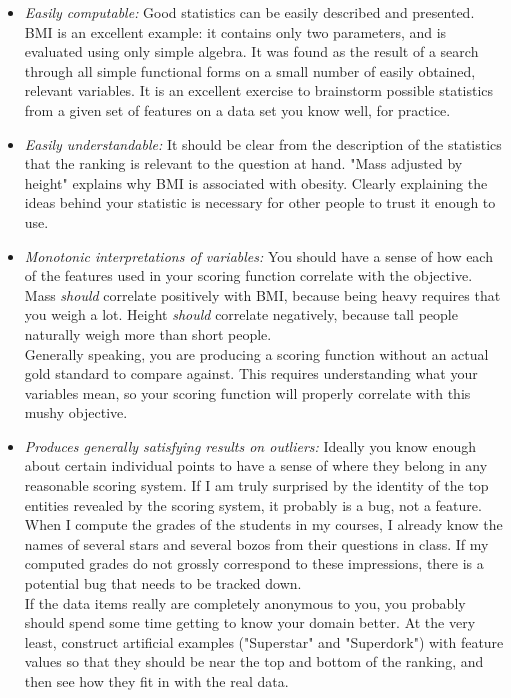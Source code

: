 \documentclass[10pt]{article}
\begin{document}
\begin{itemize}
    \item \textit{Easily computable:} Good statistics can be easily described and presented. BMI is an excellent example: it contains only two parameters, and is evaluated using only simple algebra. It was found as the result of a search through all simple functional forms on a small number of easily obtained, relevant variables. It is an excellent exercise to brainstorm possible statistics from a given set of features on a data set you know well, for practice.
    \item \textit{Easily understandable:} It should be clear from the description of the statistics that the ranking is relevant to the question at hand. "Mass adjusted by height" explains why BMI is associated with obesity. Clearly explaining the ideas behind your statistic is necessary for other people to trust it enough to use.
    \item \textit{Monotonic interpretations of variables:} You should have a sense of how each of the features used in your scoring function correlate with the objective. Mass \textit{should} correlate positively with BMI, because being heavy requires that you weigh a lot. Height \textit{should} correlate negatively, because tall people naturally weigh more than short people.\\
    Generally speaking, you are producing a scoring function without an actual gold standard to compare against. This requires understanding what your variables mean, so your scoring function will properly correlate with this mushy objective.
    \item \textit{Produces generally satisfying results on outliers:} Ideally you know enough about certain individual points to have a sense of where they belong in any reasonable scoring system. If I am truly surprised by the identity of the top entities revealed by the scoring system, it probably is a bug, not a feature. When I compute the grades of the students in my courses, I already know the names of several stars and several bozos from their questions in class. If my computed grades do not grossly correspond to these impressions, there is a potential bug that needs to be tracked down.\\
    If the data items really are completely anonymous to you, you probably should spend some time getting to know your domain better. At the very least, construct artificial examples ("Superstar" and "Superdork") with feature values so that they should be near the top and bottom of the ranking, and then see how they fit in with the real data.

\end{itemize}
\end{document}
